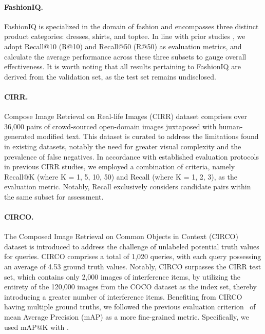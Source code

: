 \documentclass[10pt,twocolumn,letterpaper]{article}
\begin{document}
\paragraph{FashionIQ.} FashionIQ \cite{wu2021fashion} is specialized in the domain of fashion and encompasses three distinct product categories: dresses, shirts, and toptee. In line with prior studies \cite{lee2021cosmo}, we adopt Recall@10 (R@10) and Recall@50 (R@50) as evaluation metrics, and calculate the average performance across these three subsets to gauge overall effectiveness. It is worth noting that all results pertaining to FashionIQ are derived from the validation set, as the test set remains undisclosed.

\paragraph{CIRR.} Compose Image Retrieval on Real-life Images (CIRR) \cite{liu2021image} dataset comprises over 36,000 pairs of crowd-sourced open-domain images juxtaposed with human-generated modified text. This dataset is curated to address the limitations found in existing datasets, notably the need for greater visual complexity and the prevalence of false negatives. In accordance with established evaluation protocols~\cite{liu2021image} in previous CIRR studies, we employed a combination of criteria, namely Recall@K (where K = 1, 5, 10, 50) and Recall (where K = 1, 2, 3), as the evaluation metric. Notably, Recall exclusively considers candidate pairs within the same subset for assessment.

\paragraph{CIRCO.} The Composed Image Retrieval on Common Objects in Context (CIRCO) \cite{Baldrati_2023_ICCV} dataset is introduced to address the challenge of unlabeled potential truth values for queries. CIRCO comprises a total of 1,020 queries, with each query possessing an average of 4.53 ground truth values. Notably, CIRCO surpasses the CIRR test set, which contains only 2,000 images of interference items, by utilizing the entirety of the 120,000 images from the COCO dataset \cite{lin2014microsoft} as the index set, thereby introducing a greater number of interference items. Benefiting from CIRCO having multiple ground truths, we followed the previous evaluation criterion~\cite{Baldrati_2023_ICCV} of mean Average Precision (mAP) as a more fine-grained metric. Specifically, we used mAP@K with .
\end{document}
